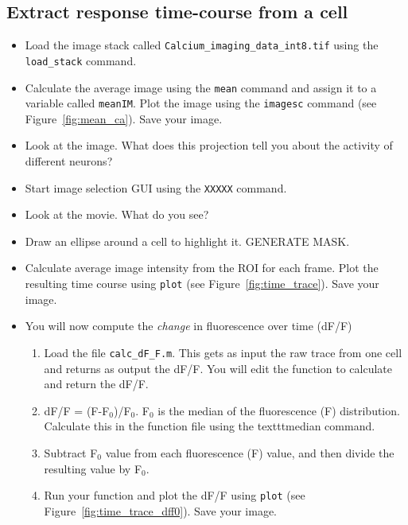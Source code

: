 \documentclass[paper=a4, fontsize=11pt]{scrartcl} %
\numberwithin{equation}{section} %
\numberwithin{figure}{section} %
\numberwithin{table}{section} %
\newcommand{\sub}[1]{\ensuremath{_{#1}}}
\begin{document}
\subsection{Extract response time-course from a cell}
\begin{itemize}
\setlength{\parskip}{0.25em}
\item Load the image stack called \texttt{Calcium\_imaging\_data\_int8.tif} using the \texttt{load\_stack} command.
\item Calculate the average image using the \texttt{mean} command and assign it to a variable called \texttt{meanIM}.  Plot the image using the \texttt{imagesc} command (see Figure~\ref{fig:mean_ca}). Save your image.
\item Look at the image. What does this projection tell you about the activity of different neurons?
\item Start image selection GUI using the \texttt{XXXXX} command.
\item Look at the movie. What do you see?
\item Draw an ellipse around a cell to highlight it. GENERATE MASK.
\item Calculate average image intensity from the ROI for each frame. Plot the resulting time course using \texttt{plot} (see Figure~\ref{fig:time_trace}). Save your image.
\item You will now compute the \textit{change} in fluorescence over time (dF/F)
	\begin{enumerate}
	\item Load the file  \texttt{calc\_dF\_F.m}. This gets as input the raw trace from one cell and returns as output the dF/F. You will edit
	the function to calculate and return the dF/F.
	\item dF/F = (F-F\sub{0})/F\sub{0}. F\sub{0} is the median of the fluorescence (F) distribution. Calculate this in the function file using the texttt{median} command.
	\item Subtract F\sub{0} value from each fluorescence (F) value, and then divide the resulting value by F\sub{0}. 	
	\item Run your function and plot the dF/F using \texttt{plot} (see Figure~\ref{fig:time_trace_dff0}). Save your image.
	\end{enumerate}
\end{itemize}
\end{document}
